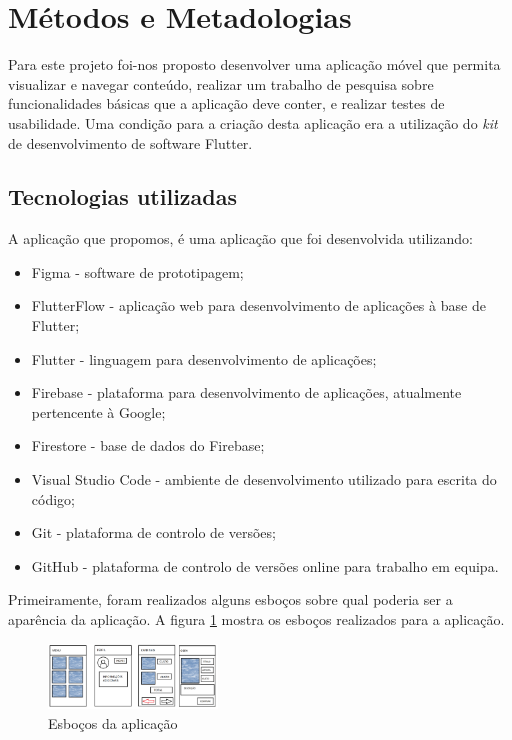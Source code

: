 \documentclass[conference]{IEEEtran}
\begin{document}
\section{Métodos e Metadologias}

Para este projeto foi-nos proposto desenvolver uma aplicação móvel que 
permita visualizar e navegar conteúdo, realizar um trabalho de pesquisa 
sobre funcionalidades básicas que a aplicação deve conter, e realizar testes 
de usabilidade. Uma condição para a criação desta aplicação era a utilização 
do \textit{kit} de desenvolvimento de software Flutter.

\subsection{Tecnologias utilizadas}

A aplicação que propomos, é uma aplicação que foi desenvolvida utilizando:

\begin{itemize}
    \item Figma - software de prototipagem;
    \item FlutterFlow - aplicação web para desenvolvimento de aplicações à base de Flutter;
    \item Flutter - linguagem para desenvolvimento de aplicações;
    \item Firebase - plataforma para desenvolvimento de aplicações, atualmente pertencente à Google;
    \item Firestore - base de dados do Firebase;
    \item Visual Studio Code - ambiente de desenvolvimento utilizado para escrita do código;
    \item Git - plataforma de controlo de versões;
    \item GitHub - plataforma de controlo de versões online para trabalho em equipa.
\end{itemize}

Primeiramente, foram realizados alguns esboços sobre qual poderia ser a aparência da aplicação. A figura \ref{fig:sketches} 
mostra os esboços realizados para a aplicação.

\begin{figure}[ht]
    \centering
    \includegraphics[width=0.4\textwidth]{appsketches.png}
    \caption{Esboços da aplicação}
    \label{fig:sketches}
\end{figure}
\end{document}
